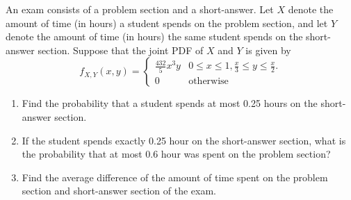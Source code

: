 \begin{example}
    An exam consists of a problem section and a short-answer. Let $X$ denote the amount of time (in hours) a student spends on the problem section, and let $Y$ denote the amount of time (in hours) the same 
    student spends on the short-answer section. Suppose that the joint PDF of $X$ and $Y$ is given by
    \[
        f_{X, Y}(x, y) = \begin{cases}
            \displaystyle \frac{432}{5}x^3y & 0 \leq x \leq 1, \frac{x}{3} \leq y \leq \frac{x}{2}.\\
            0 & \text{otherwise}
        \end{cases}
    \]
    \begin{enumerate}
        \item Find the probability that a student spends at most 0.25 hours on the short-answer section.
        \item If the student spends exactly 0.25 hour on the short-answer section, what is the 
        probability that at most 0.6 hour was spent on the problem section?
        \item Find the average difference of the amount of time spent on the problem section and 
        short-answer section of the exam.
    \end{enumerate}
\end{example}
